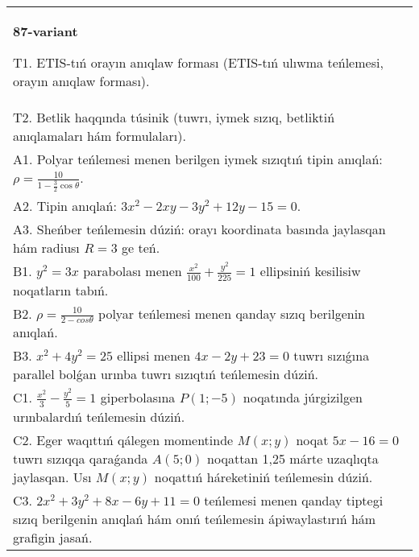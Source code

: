 \documentclass{article}
\begin{document}
\begin{tabular}{m{17cm}}
\textbf{87-variant}
\newline

T1. ETIS-tıń orayın anıqlaw forması (ETIS-tıń ulıwma teńlemesi, orayın anıqlaw forması).\\

T2. Betlik haqqında túsinik (tuwrı, iymek sızıq, betliktiń anıqlamaları hám formulaları).\\

A1. Polyar teńlemesi menen berilgen iymek sızıqtıń tipin anıqlań: $\rho=\frac{10}{1-\frac{3}{2}\cos\theta}$.\\

A2. Tipin anıqlań: $3 x^{2}-2 xy-3 y^{2}+12 y-15=0$.\\

A3. Sheńber teńlemesin dúziń: orayı koordinata basında jaylasqan hám radiusı $R=3$ ge teń.\\

B1. $y^{2} = 3x$ parabolası menen $\frac{x^{2}}{100} + \frac{y^{2}}{225} = 1$ ellipsiniń kesilisiw noqatların tabıń.  \\

B2. $\rho = \frac{10}{2 - cos\theta}$ polyar teńlemesi menen qanday sızıq berilgenin anıqlań.  \\

B3. $x^{2} + 4y^{2} = 25$ ellipsi menen $4x - 2y + 23 = 0$ tuwrı sızıǵına parallel bolǵan urınba tuwrı sızıqtıń teńlemesin dúziń.  \\

C1. $\frac{x^{2}}{3} - \frac{y^{2}}{5} = 1$ giperbolasına $P(1; - 5)$ noqatında júrgizilgen urınbalardıń teńlemesin dúziń.\\

C2. Eger waqıttıń qálegen momentinde $M(x;y)$ noqat $5x - 16 = 0$ tuwrı sızıqqa qaraǵanda $A(5;0)$ noqattan 1,25 márte uzaqlıqta jaylasqan. Usı $M(x;y)$ noqattıń háreketiniń teńlemesin dúziń.  \\

C3. $2x^{2} + 3y^{2} + 8x - 6y + 11 = 0$ teńlemesi menen qanday tiptegi sızıq berilgenin anıqlań hám onıń teńlemesin ápiwaylastırıń hám grafigin jasań.  \\

\end{tabular}
\vspace{1cm}
\end{document}
